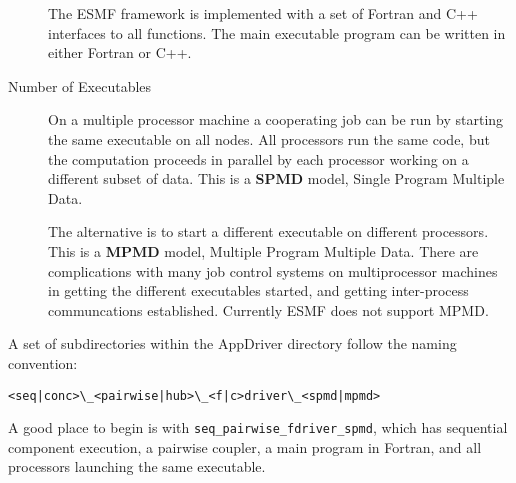 \begin{description}
The ESMF framework is implemented with a set of Fortran and C++ interfaces
to all functions.  The main executable program can be written in either
Fortran or C++.

\item[Number of Executables]

On a multiple processor machine a cooperating job can be run 
by starting the same executable on all nodes.  All processors run the
same code, but the computation proceeds in parallel by each processor 
working on a different subset of data.  This is a {\bf SPMD} model, 
Single Program Multiple Data.  

The alternative is to start a different executable on different
processors.  This is a {\bf MPMD} model, Multiple Program Multiple Data.
There are complications with many job control systems on multiprocessor
machines in getting the different executables started, and getting
inter-process communcations established.  Currently ESMF does not
support MPMD.

\end{description}

A set of subdirectories within the AppDriver directory follow the naming 
convention:
\begin{verbatim}
<seq|conc>\_<pairwise|hub>\_<f|c>driver\_<spmd|mpmd>
\end{verbatim}

A good place to begin is with {\tt seq\_pairwise\_fdriver\_spmd}, which
has sequential component execution, a pairwise coupler, a main program
in Fortran, and all processors launching the same executable.




